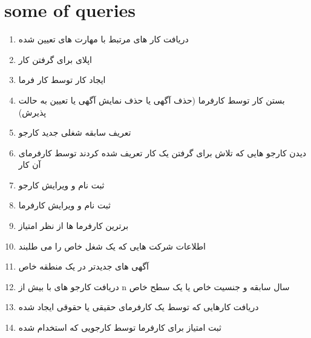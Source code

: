 \documentclass{article}
\begin{document}
\section{some of queries}
\begin{enumerate}
\item                         دریافت کار های مرتبط با مهارت های تعیین شده
\item اپلای برای گرفتن کار
\item ایجاد کار توسط کار فرما
\item بستن کار توسط کارفرما (حذف آگهی یا حذف نمایش آگهی یا تعیین به حالت پذیرش)
\item تعریف سابقه شغلی جدید کارجو
\item دیدن کارجو هایی که تلاش برای گرفتن یک کار تعریف شده کردند توسط کارفرمای آن کار
\item ثبت نام و ویرایش کارجو
\item ثبت نام و ویرایش کارفرما
\item برترین کارفرما ها از نظر امتیاز
\item اطلاعات شرکت هایی که یک شغل خاص را می طلبند
\item آگهی های جدیدتر در یک منطقه خاص
\item دریافت کارجو های با بیش از n سال سابقه و جنسیت خاص یا یک سطح خاص
\item دریافت کارهایی که توسط یک کارفرمای حقیقی یا حقوقی ایجاد شده
\item ثبت امتیاز برای کارفرما توسط کارجویی که استخدام شده

\end{enumerate}
	\newpage
%
%		

%	
	
	
	 	
%
	
\end{document}
